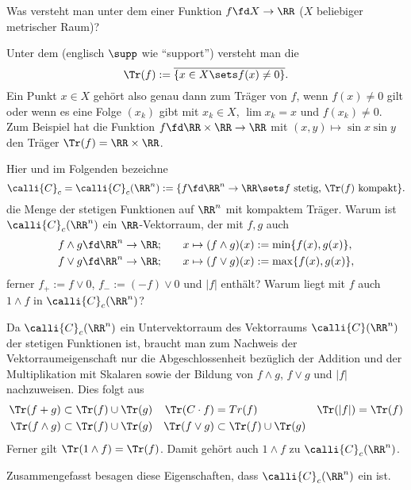 \begin{frage}
  Was versteht man unter dem  einer Funktion 
  $f\fd X\to\RR$ ($X$ beliebiger metrischer Raum)?
\end{frage}

\begin{antwort}
  Unter dem  
  (englisch $\supp$ wie "`support"') versteht man die 
  \[
  \Tr (f ) := \overline{ \{ x\in X \sets f(x)\not=0 \} }.
  \]
  Ein Punkt $x\in X$ geh\"ort also genau dann zum Tr\"ager von $f$, 
  wenn $f(x)\not=0$ gilt oder wenn es eine Folge $(x_k)$ gibt 
  mit $x_k\in X$, $\lim x_k = x$ und $f(x_k) \not=0$. 
  Zum Beispiel hat die Funktion $f \fd \RR\times\RR\to\RR$ mit 
  $(x,y) \mapsto \sin x\sin y$ den Träger $\Tr(f) = \RR\times\RR$. 
  \AntEnd
\end{antwort}

\begin{frage}
  Hier und im Folgenden bezeichne
  \[
  \calli{C}_c = 
  \calli{C}_c (\RR^n) := \{f\fd \RR^n \to \RR\sets 
  \text{$f$ stetig, $\Tr(f)$ kompakt}\}.
  \]
  die Menge der stetigen Funktionen auf $\RR^n$ mit kompaktem 
  Träger. 
  Warum ist $\calli{C}_c (\RR^n)$ 
  ein $\RR$-Vektorraum, der mit $f,g$ 
  auch 
  \begin{align*}
    f\wedge g\fd \RR^n \to \RR; &\qquad x\mapsto
    (f \wedge g) (x) := \min \{ f(x), g(x) \},\\
    f\vee g\fd \RR^n \to \RR; &\qquad x\mapsto
    (f \vee g) (x) := \max \{ f(x), g(x) \},
  \end{align*}
  ferner $f_+ := f\vee0$, $f_- := (-f)\vee 0$ und $|f|$ enth\"alt? 
  Warum liegt mit $f$ auch $1\wedge f$ in $\calli{C}_c(\RR^n)$? 
\end{frage}

\begin{antwort}
  
  Da $\calli{C}_c(\RR^n)$ 
  ein Untervektorraum des Vektorraums $\calli{C}( \RR^n )$ der 
  stetigen Funktionen ist, braucht man 
  zum Nachweis der Vektorraumeigenschaft nur die 
  Abgeschlossenheit bez\"uglich 
  der Addition und der Multiplikation 
  mit Skalaren sowie der Bildung von 
  $f\wedge g$, $f\vee g$ und $|f|$ nachzuweisen. Dies folgt aus 
  \begin{align*}
    \Tr (f+g) &\subset \Tr(f)\cup\Tr(g) & \Tr(C \cdot f) &= Tr (f) 
    &\Tr ( | f | ) &= \Tr (f)  \\
    \Tr (f\wedge g) &\subset \Tr(f)\cup\Tr(g) & 
    \Tr (f\vee g) &\subset \Tr(f)\cup\Tr(g) & &
  \end{align*} 
  Ferner gilt $\Tr( 1\wedge f)=\Tr(f)$. Damit gehört auch 
  $1\wedge f$ zu $\calli{C}_c(\RR^n)$. 

  Zusammengefasst besagen diese Eigenschaften, dass $\calli{C}_c(\RR^n)$ 
  ein  ist. 
  \AntEnd
\end{antwort}


